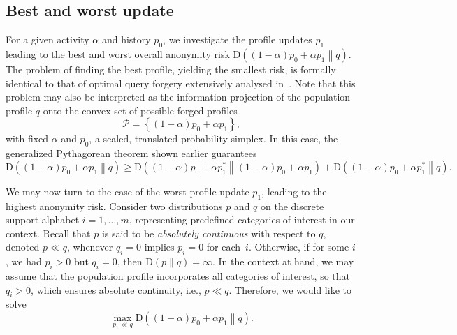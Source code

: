 \subsection{Best and worst update}
\label{sec:1-6}

\noindent
For a given activity $\alpha$ and history $p_0$, we investigate the profile updates $p_1$ leading to the best and worst overall anonymity risk $\mathrm{D}\left((1-\alpha)p_0+\alpha p_1\middle\|q\right)$. The problem of finding the best profile, yielding the smallest risk, is formally identical to that of optimal query forgery extensively analysed in~\cite{Rebollo10IT}. Note that this problem may also be interpreted as the information projection of the population profile $q$ onto the convex set of possible forged profiles
\begin{equation*}
\mathscr{P}=\left\{(1-\alpha)p_0+\alpha p_1\right\},
\end{equation*}
with fixed $\alpha$ and $p_0$, a scaled, translated probability simplex. In this case, the generalized Pythagorean theorem shown earlier guarantees
\begin{equation*}
\mathrm{D}\left((1-\alpha)p_0+\alpha p_1\middle\|q\right)\geqslant\mathrm{D}\left((1-\alpha)p_0+\alpha p_1^*\middle\|(1-\alpha)p_0+\alpha p_1\right)+\mathrm{D}\left((1-\alpha)p_0+\alpha p_1^*\middle\|q\right).
\end{equation*}

We may now turn to the case of the worst profile update $p_1$, leading to the highest anonymity risk. Consider two distributions $p$ and $q$ on the discrete support alphabet $i=1,\dots,m$, representing predefined categories of interest in our context. Recall that $p$ is said to be \emph{absolutely continuous} with respect to $q$, denoted $p\ll q$, whenever $q_i=0$ implies $p_i=0$ for each~$i$. Otherwise, if for some $i$, we had $p_i>0$ but $q_i=0$, then $\mathrm{D}(p\|q)=\infty$. In the context at hand, we may assume that the population profile incorporates all categories of interest, so that $q_i>0$, which ensures absolute continuity, i.e., $p\ll q$. Therefore, we would like to solve 
\begin{equation*}
\max_{p_1\ll q} \mathrm{D}\left((1-\alpha)p_0+\alpha p_1\middle\|q\right).
\end{equation*}

